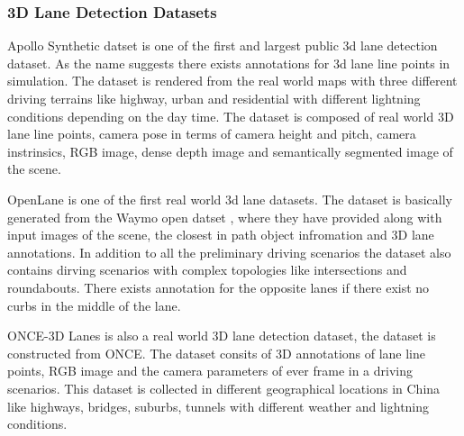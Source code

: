 \subsubsection{3D Lane Detection Datasets}
Apollo Synthetic datset\cite{guo2020gen} is one of the first and largest public 3d lane detection dataset. As the name suggests there exists annotations for 3d lane line points in simulation. The dataset is rendered from the real world maps with three different driving terrains like highway, urban and residential with different lightning conditions depending on the day time. The dataset is composed of real world 3D lane line points, camera pose in terms of camera height and pitch, camera instrinsics, RGB image, dense depth image and semantically segmented image of the scene.

OpenLane \cite{chen2022persformer} is one of the first real world 3d lane datasets. The dataset is basically generated from the Waymo open datset \cite{Sun_2020_CVPR}, where they have provided along with input images of the scene, the closest in path object infromation and 3D lane annotations. In addition to all the preliminary driving scenarios the dataset also contains dirving scenarios with complex topologies like intersections and roundabouts. There exists annotation for the opposite lanes if there exist no curbs in the middle of the lane. 

ONCE-3D Lanes \cite{yan2022once} is also a real world 3D lane detection dataset, the dataset is constructed from ONCE\cite{mao2021one}. The dataset consits of 3D annotations of lane line points, RGB image and the camera parameters of ever frame in a driving scenarios. This dataset is collected in different geographical locations in China like highways, bridges, suburbs, tunnels with different weather and lightning conditions.


